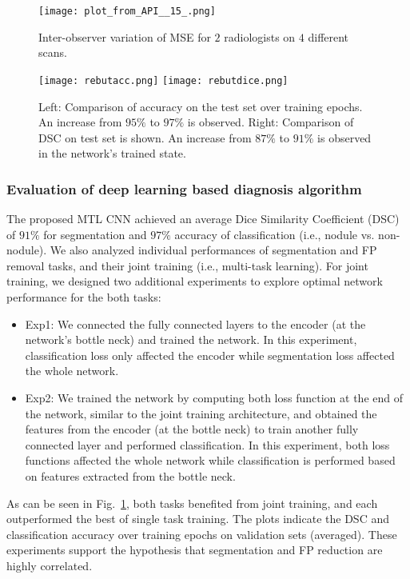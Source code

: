 \documentclass[preprint,12pt]{elsarticle}
\begin{document}
\begin{figure}
\texttt{[image: plot\_from\_API\_\_15\_.png]}
\caption{Inter-observer variation of MSE for $2$ radiologists on $4$ different scans. \label{fig:lungvariationplot}}
\texttt{[image: rebutacc.png]}
 \texttt{[image: rebutdice.png]}
  \caption{Left: Comparison of accuracy on the test set over training epochs. An increase from $95\%$ to $97\%$ is observed. Right: Comparison of DSC on test set is shown. An increase from $87\%$ to $91\%$ is observed in the network's trained state.}    \label{fig:jointvssingle}
\end{figure}

\subsubsection{Evaluation of deep learning based diagnosis algorithm} 
The proposed MTL CNN achieved an average Dice Similarity Coefficient (DSC) of $91\%$ for segmentation and $97\%$ accuracy of classification (i.e., nodule vs. non-nodule). We also analyzed individual performances of segmentation and FP removal tasks, and their joint training (i.e., multi-task learning). For joint training, we designed two additional experiments to explore optimal network performance for the both tasks: 
\begin{itemize}
\item Exp1: We connected the fully connected layers to the encoder (at the network's bottle neck) and trained the network. In this experiment, classification loss only affected the encoder while segmentation loss affected the whole network.
\item Exp2: We trained the network by computing both loss function at the end of the network, similar to the joint training architecture, and obtained the features from the encoder (at the bottle neck) to train another fully connected layer and performed classification. In this experiment, both loss functions affected the whole network while classification is performed based on features extracted from the bottle neck.
\end{itemize}
As can be seen in Fig.~\ref{fig:jointvssingle}, both tasks benefited from joint training, and each outperformed the best of single task training. The plots indicate the DSC and classification accuracy over training epochs on validation sets (averaged). These experiments support the hypothesis that segmentation and FP reduction are highly correlated.
\end{document}
